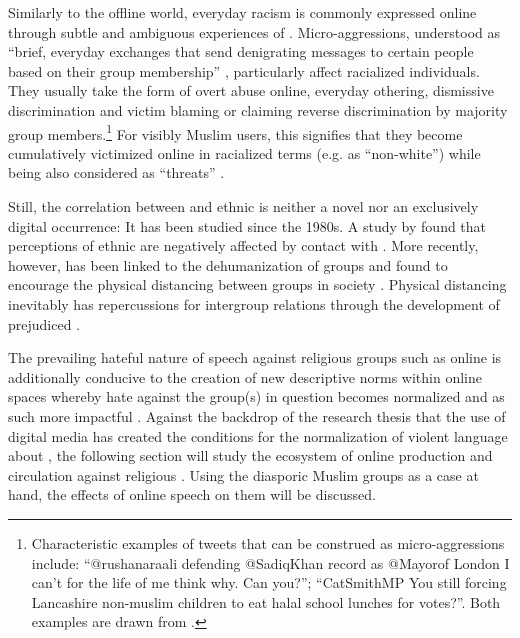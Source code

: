 \documentclass[output=paper,colorlinks,citecolor=brown]{langscibook}
\begin{document}
Similarly to the offline world, everyday racism is commonly expressed online through subtle and ambiguous experiences of  \citep[2]{nadim2023}. Micro-aggressions, understood as ``brief, everyday exchanges that send denigrating messages to certain people based on their group membership'' \citep[36]{sue_spanierman2020}, particularly affect racialized individuals. They usually take the form of overt abuse online, everyday othering, dismissive discrimination and victim blaming or claiming reverse discrimination by majority group members.\footnote{%
Characteristic examples of tweets that can be construed as micro-aggressions include: ``@rushanaraali defending @SadiqKhan record as @Mayorof London I can't for the life of me think why. Can you?''; ``CatSmithMP You still forcing Lancashire non-muslim children to eat halal school lunches for votes?''. Both examples are drawn from \citet{harmer_southern2021}.} 
For visibly Muslim users, this signifies that they become cumulatively victimized online in racialized terms (e.g. as ``non-white'') while being also considered as ``threats'' \citep{bravo-lopez2011}.

Still, the correlation between  and ethnic  is neither a novel nor an exclusively digital occurrence: It has been studied since the 1980s. A study by \citet{greenberg_pyszczynski1985} found that perceptions of ethnic  are negatively affected by contact with . More recently, however,  has been linked to the dehumanization of  groups and found to encourage the physical distancing between groups in society \citep{soral_bilewicz_winiewski2018}. Physical distancing inevitably has repercussions for intergroup relations through the development of prejudiced .

The prevailing hateful nature of speech against religious  groups such as  online is additionally conducive to the creation of new descriptive norms within online spaces whereby hate against the group(s) in question becomes normalized and as such more impactful \citep[4]{soral_liu_bilewicz2020}. Against the backdrop of the research thesis that the use of digital media has created the conditions for the normalization of violent language about  \citep{soral_liu_bilewicz2020}, the following section will study the ecosystem of online  production and circulation against religious . Using the diasporic Muslim groups as a case at hand, the effects of online speech on them will be discussed.
\end{document}
